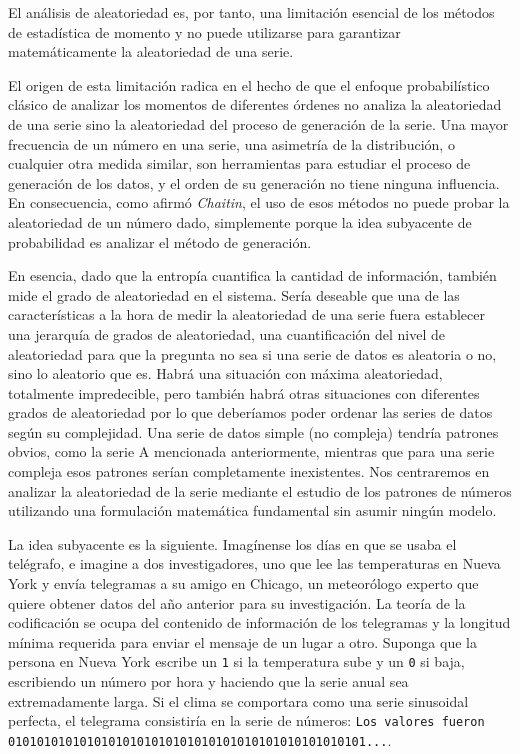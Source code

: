 \documentclass[a4paper,12pt]{article}
\begin{document}
El análisis de aleatoriedad es, por tanto, una limitación esencial de los métodos de estadística de momento y no puede utilizarse para garantizar matemáticamente la aleatoriedad de una serie.

El origen de esta limitación radica en el hecho de que el enfoque probabilístico clásico de analizar los momentos de diferentes órdenes no analiza la aleatoriedad de una serie sino la aleatoriedad del proceso de generación de la serie. Una mayor frecuencia de un número en una serie, una asimetría de la distribución, o cualquier otra medida similar, son herramientas para estudiar el proceso de generación de los datos, y el orden de su generación no tiene ninguna influencia. En consecuencia, como afirmó \textit{Chaitin}, el uso de esos métodos no puede probar la aleatoriedad de un número dado, simplemente porque la idea subyacente de probabilidad es analizar el método de generación. 

En esencia, dado que la entropía cuantifica la cantidad de información, también mide el grado de aleatoriedad en el sistema. Sería deseable que una de las características a la hora de medir la aleatoriedad de una serie fuera establecer una jerarquía de grados de aleatoriedad, una cuantificación del nivel de aleatoriedad para que la pregunta no sea si una serie de datos es aleatoria o no, sino lo aleatorio que es. Habrá una situación con máxima aleatoriedad, totalmente impredecible, pero también habrá otras situaciones con diferentes grados de aleatoriedad por lo que deberíamos poder ordenar las series de datos según su complejidad. Una serie de datos simple (no compleja) tendría patrones obvios, como la serie A mencionada anteriormente, mientras que para una serie compleja esos patrones serían completamente inexistentes. Nos centraremos en analizar la aleatoriedad de la serie mediante el estudio de los patrones de números utilizando una formulación matemática fundamental sin asumir ningún modelo.

La idea subyacente es la siguiente. Imagínense los días en que se usaba el telégrafo, e imagine a dos investigadores, uno que lee las temperaturas en Nueva York y envía telegramas a su amigo en Chicago, un meteorólogo experto que quiere obtener datos del año anterior para su investigación. La teoría de la codificación se ocupa del contenido de información de los telegramas y la longitud mínima requerida para enviar el mensaje de un lugar a otro. Suponga que la persona en Nueva York escribe un \texttt{1} si la temperatura sube y un \texttt{0} si baja, escribiendo un número por hora y haciendo que la serie anual sea extremadamente larga. Si el clima se comportara como una serie sinusoidal perfecta, el telegrama consistiría en la serie de números:
\texttt{Los valores fueron 01010101010101010101010101010101010101010101010101...}.
\end{document}
